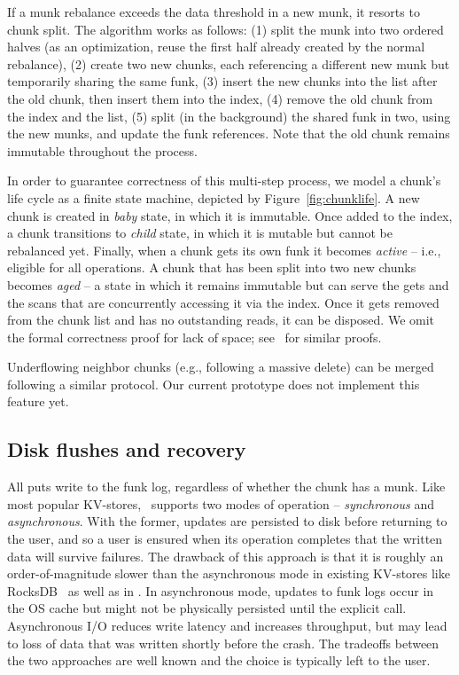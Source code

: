 {If a munk rebalance exceeds the data threshold in a new munk, it resorts to chunk split. The algorithm works as 
follows: (1) split the munk into two ordered halves (as an optimization, reuse the first half already
created by the normal rebalance), (2) create two new chunks, each referencing a different new munk
but temporarily sharing the same funk, (3) insert the new chunks into the list after the old chunk, then insert them 
into the index, (4) remove the old chunk from the index and the list, (5) split (in the background) the shared 
funk in two, using the new munks, and update the funk references. Note that the old chunk remains immutable
throughout the process. 

In order to guarantee correctness of this multi-step process, we model a chunk's life cycle as a finite state machine, 
depicted by Figure~\ref{fig:chunklife}. A new chunk is created in \emph{baby} state, in which it is immutable. Once added 
to the index, a chunk transitions to \emph{child} state, in which it is mutable but cannot be rebalanced yet. Finally, when 
a chunk gets its own funk it becomes \emph{active} -- i.e., eligible for all operations. A chunk that has been split into 
two new chunks becomes \emph{aged} -- a state in which it remains immutable but can serve the gets and the scans 
that are concurrently accessing it via the index. Once it gets removed from the chunk list and has no outstanding
reads, it can be disposed. We omit the formal correctness proof for lack of space; see~\cite{kiwi} for similar proofs.   

Underflowing neighbor chunks (e.g., following a massive delete) can be merged following a similar protocol. 
Our current \sys\/ prototype does not implement this feature yet. 
}

\subsection{Disk flushes and recovery}
\label{ssec:flush-recovery}

All puts write to the funk log, regardless of whether the chunk has a munk. Like most popular KV-stores, \sys\ supports 
two modes of operation -- \emph{synchronous} and \emph{asynchronous}. With the former,  updates are persisted to disk 
before returning to the user, and so a user is ensured when its operation completes that the written data will survive failures. 
The drawback of this approach is that it is roughly an order-of-magnitude slower than the asynchronous mode in existing KV-stores 
like RocksDB~\cite{RocksDB} as well as in \sys. In asynchronous mode, updates to funk logs occur in the OS cache but might 
not be physically persisted until the explicit  call.  Asynchronous I/O reduces write latency and increases throughput, but 
may lead to loss of data that was written shortly before the crash. The tradeoffs between the two approaches are 
well known and the choice is typically left to the user.

